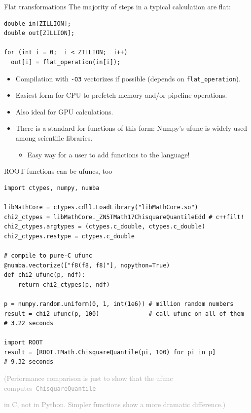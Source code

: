 \documentclass{beamer}
\begin{document}
\begin{frame}[fragile]{Flat transformations}
\vspace{0.5 cm}
The majority of steps in a typical calculation are flat:

\begin{center}
\begin{minipage}{0.7\linewidth}
\small
\begin{verbatim}
double in[ZILLION];
double out[ZILLION];

for (int i = 0;  i < ZILLION;  i++)
  out[i] = flat_operation(in[i]);
\end{verbatim}
\end{minipage}
\end{center}

\begin{itemize}
\item Compilation with {\tt -O3} vectorizes if possible (depends on {\tt flat\_operation}).
\item Easiest form for CPU to prefetch memory and/or pipeline operations.
\item Also ideal for GPU calculations.
\item There is a standard for functions of this form: Numpy's ufunc is widely used among scientific libraries.
\begin{itemize}
\item Easy way for a user to add functions to the language!
\end{itemize}
\end{itemize}
\end{frame}

\begin{frame}[fragile]{ROOT functions can be ufuncs, too}
\vspace{0.3 cm}
\scriptsize
\begin{verbatim}
import ctypes, numpy, numba

libMathCore = ctypes.cdll.LoadLibrary("libMathCore.so")
chi2_ctypes = libMathCore._ZN5TMath17ChisquareQuantileEdd # c++filt!
chi2_ctypes.argtypes = (ctypes.c_double, ctypes.c_double)
chi2_ctypes.restype = ctypes.c_double

# compile to pure-C ufunc
@numba.vectorize(["f8(f8, f8)"], nopython=True)
def chi2_ufunc(p, ndf):
    return chi2_ctypes(p, ndf)

p = numpy.random.uniform(0, 1, int(1e6)) # million random numbers
result = chi2_ufunc(p, 100)              # call ufunc on all of them
# 3.22 seconds

import ROOT
result = [ROOT.TMath.ChisquareQuantile(pi, 100) for pi in p]
# 9.32 seconds
\end{verbatim}

\vspace{0.5 cm}
\textcolor{darkgray}{(Performance comparison is just to show that the ufunc \mbox{computes {\tt ChisquareQuantile}\hspace{-1 cm}}}

\vspace{-0.1 cm}
\textcolor{darkgray}{in C, not in Python. Simpler functions show a more dramatic difference.)}
\end{frame}
\end{document}
